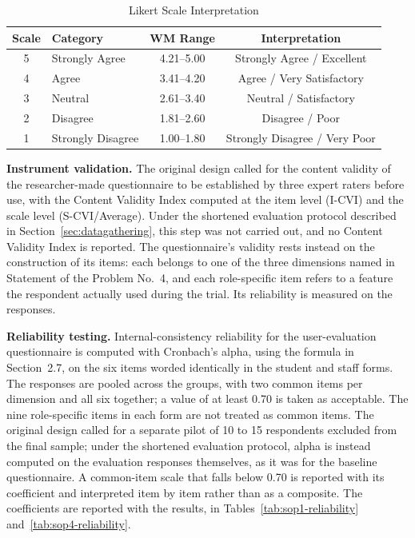 \documentclass{research}
\begin{document}
\begin{table}[!ht]
  \caption{Likert Scale Interpretation}
  \label{tab:likert}
  \centering
  \begin{tabular}{clcc}
    \toprule
    \textbf{Scale} & \textbf{Category} & \textbf{WM Range} &
    \textbf{Interpretation} \\
    \midrule
    5 & Strongly Agree    & 4.21--5.00 & Strongly Agree / Excellent \\
    4 & Agree             & 3.41--4.20 & Agree / Very Satisfactory \\
    3 & Neutral           & 2.61--3.40 & Neutral / Satisfactory \\
    2 & Disagree          & 1.81--2.60 & Disagree / Poor \\
    1 & Strongly Disagree & 1.00--1.80 & Strongly Disagree / Very Poor \\
    \bottomrule
  \end{tabular}
\end{table}

\textbf{Instrument validation.} The original design called for the
content validity of the researcher-made questionnaire to be established
by three expert raters before use, with the Content Validity Index
computed at the item level (I-CVI) and the scale level (S-CVI/Average).
Under the shortened evaluation protocol described in
Section~\ref{sec:datagathering}, this step was not carried out, and no
Content Validity Index is reported. The questionnaire's validity rests
instead on the construction of its items: each belongs to one of the
three dimensions named in Statement of the Problem No.~4, and each
role-specific item refers to a feature the respondent actually used
during the trial. Its reliability is measured on the responses.

\textbf{Reliability testing.} Internal-consistency reliability for the
user-evaluation questionnaire is computed with Cronbach's alpha, using
the formula in Section~2.7, on the six items worded identically in the
student and staff forms. The responses are pooled across the groups,
with two common items per dimension and all six together; a value of at
least 0.70 is taken as acceptable. The nine role-specific items in each
form are not treated as common items. The original design called for a separate
pilot of 10 to 15 respondents excluded from the final sample; under the
shortened evaluation protocol, alpha is instead computed on the
evaluation responses themselves, as it was for the baseline
questionnaire. A common-item scale that falls below 0.70 is reported with its
coefficient and interpreted item by item rather than as a composite. The
coefficients are reported with the results, in
Tables~\ref{tab:sop1-reliability} and~\ref{tab:sop4-reliability}.
\end{document}
